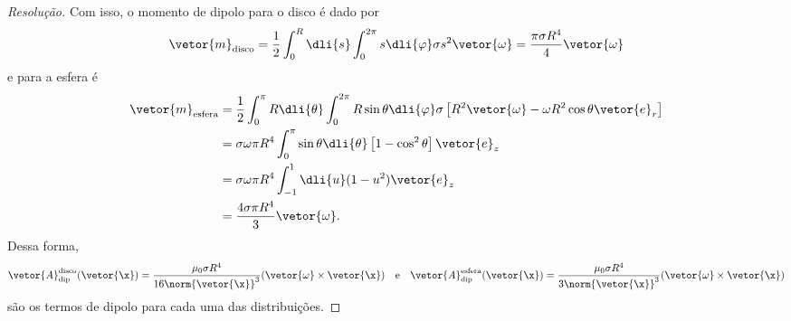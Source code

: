 \begin{proof}[Resolução]
    Com isso, o momento de dipolo para o disco é dado por
    \begin{equation*}
        \vetor{m}_\mathrm{disco} = \frac12 \int_0^R \dli{s} \int_0^{2\pi} s \dli{\varphi} \sigma s^2 \vetor{\omega} = \frac{\pi \sigma R^4 }{4}\vetor{\omega}
    \end{equation*}
    e para a esfera é
    \begin{align*}
        \vetor{m}_\mathrm{esfera} &= \frac12 \int_0^{\pi} R\dli{\theta}\int_{0}^{2\pi} R \sin\theta \dli{\varphi} \sigma\left[R^2 \vetor{\omega} - \omega R^2 \cos\theta \vetor{e}_r\right]\\
                                  &= \sigma \omega \pi R^4 \int_0^\pi \sin\theta\dli{\theta} \left[1 - \cos^2\theta\right]\vetor{e}_z\\
                                  &= \sigma \omega \pi R^4 \int_{-1}^{1} \dli{u} (1 - u^2) \vetor{e}_z\\
                                  &= \frac{4 \sigma \pi R^4}{3}\vetor{\omega}.
    \end{align*}
    Dessa forma,
    \begin{equation*}
        \vetor{A}_\mathrm{dip}^\mathrm{disco}(\vetor{\x}) = \frac{\mu_0 \sigma R^4}{16\norm{\vetor{\x}}^3} (\vetor{\omega} \times \vetor{\x})
        \quad\text{e}\quad
        \vetor{A}_\mathrm{dip}^\mathrm{esfera}(\vetor{\x}) = \frac{\mu_0 \sigma R^4}{3 \norm{\vetor{\x}}^3} (\vetor{\omega}\times \vetor{\x})
    \end{equation*}
    são os termos de dipolo para cada uma das distribuições.
\end{proof}
